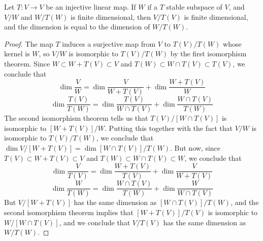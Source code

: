 \begin{theorem}
    Let $T:V \to V$ be an injective linear map. If $W$ if a $T$ stable subspace of $V$, and $V/W$ and $W/T(W)$ is finite dimensional, then $V/T(V)$ is finite dimensional, and the dimension is equal to the dimension of $W/T(W)$.
\end{theorem}
\begin{proof}
    The map $T$ induces a surjective map from $V$ to $T(V)/T(W)$ whose kernel is $W$, so $V/W$ is isomorphic to $T(V)/T(W)$ by the first isomorphism theorem. Since $W \subset W + T(V) \subset V$ and $T(W) \subset W \cap T(V) \subset T(V)$, we conclude that
    \[ \dim \frac{V}{W} = \dim \frac{V}{W + T(V)} + \dim \frac{W + T(V)}{W} \]
    \[ \dim \frac{T(V)}{T(W)} = \dim \frac{T(V)}{W \cap T(V)} + \dim \frac{W \cap T(V)}{T(W)} \]
    The second isomorphism theorem tells us that $T(V)/[W \cap T(V)]$ is isomorphic to $[W + T(V)]/W$. Putting this together with the fact that $V/W$ is isomorphic to $T(V)/T(W)$, we conclude that $\dim V/[W + T(V)] = \dim [W \cap T(V)]/T(W)$. But now, since $T(V) \subset W + T(V) \subset V$ and $T(W) \subset W \cap T(V) \subset W$, we conclude that
    \[ \dim \frac{V}{T(V)} = \dim \frac{W + T(V)}{T(V)} + \dim \frac{V}{W + T(V)} \]
    \[ \dim \frac{W}{T(W)} = \dim \frac{W \cap T(V)}{T(W)} + \dim \frac{W}{W \cap T(V)} \]
    But $V/[W + T(V)]$ has the same dimension as $[W \cap T(V)]/T(W)$, and the second isomorphism theorem implies that $[W + T(V)]/T(V)$ is isomorphic to $W/[W \cap T(V)]$, and we conclude that $V/T(V)$ has the same dimension as $W/T(W)$.
\end{proof}


